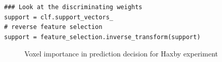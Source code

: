 \documentclass{frontiersSCNS} %
\newcounter{x}
\newcounter{y}
\begin{document}
\begin{lstlisting}
### Look at the discriminating weights
support = clf.support_vectors_
# reverse feature selection
support = feature_selection.inverse_transform(support)
\end{lstlisting}

\begin{figure}[hbtp]
  \begin{center}
  \end{center}
\caption{Voxel importance in prediction decision for Haxby experiment}
\label{fig:haxby}
\end{figure}
\end{document}
